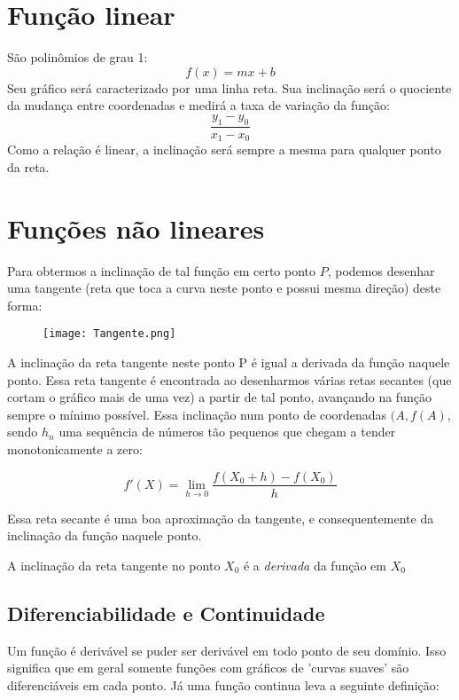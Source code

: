 \documentclass[12pt,a4paper,oneside,brazil]{abntex2}
\begin{document}
\section{Função linear}
São polinômios de grau 1:
\[ f(x) = m x + b \]
Seu gráfico será caracterizado por uma linha reta. Sua inclinação será o quociente da mudança entre coordenadas e medirá a taxa de variação da função:
\[ \frac{y_1 - y_0}{x_1 -x_0} \]
Como a relação é linear, a inclinação será sempre a mesma para qualquer ponto da reta.


\section{Funções não lineares}
Para obtermos a inclinação de tal função em certo ponto $P$, podemos desenhar uma tangente (reta que toca a curva neste ponto e possui mesma direção) deste forma:

\begin{figure}[ht]
\centering
\texttt{[image: Tangente.png]}
\caption{\cite[p. 76]{stewart}}
\end{figure}

A inclinação da reta tangente neste ponto P é igual a derivada da
função naquele ponto. Essa reta tangente é encontrada ao desenharmos 
várias retas secantes (que cortam o gráfico mais de uma vez) a partir
 de tal ponto, avançando na função sempre o mínimo possível. Essa inclinação num ponto de coordenadas $ 
 (A, f(A) $, sendo $h_n$ uma sequência de números tão pequenos que chegam a tender monotonicamente
 a zero:

\begin{equation}\label{inclinação tangente}
f'(X) = \lim_{h \rightarrow 0} \frac{f (X_0 + h) - f (X_0)}{h}
\end{equation}

Essa  reta secante é uma boa aproximação da tangente, e consequentemente da inclinação da função naquele ponto.


A inclinação da reta tangente no ponto $X_0$ é a \emph{derivada} da função em $X_0$

\subsection{Diferenciabilidade e Continuidade}
Um função é derivável se puder ser derivável em todo ponto de seu domínio. Isso significa que em geral somente funções com gráficos de 'curvas suaves' são diferenciáveis em cada ponto. Já uma função continua leva a seguinte definição: \newline
\end{document}
